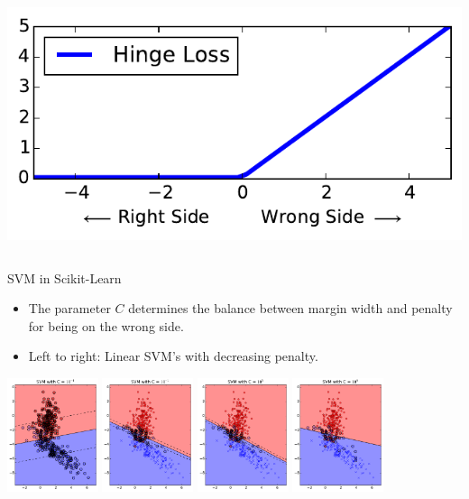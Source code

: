 \documentclass[10pt, aspectratio=169]{beamer} %
\begin{document}
\begin{frame}[fragile,allowframebreaks=0.8]
\begin{columns}[onlytextwidth]
\includegraphics[width=\columnwidth]{hinge_loss.pdf}
\end{columns}
\end{frame}


\begin{frame}[fragile,allowframebreaks=0.8]
{SVM in Scikit-Learn}
\begin{itemize}
\item The parameter $C$ determines the balance between margin width and penalty for being on the wrong side.
\item Left to right: Linear SVM's with decreasing penalty.
\end{itemize}
\begin{center}
\includegraphics[width=0.2\textwidth]{SVM_C_-4.pdf}
\includegraphics[width=0.2\textwidth]{SVM_C_-1.pdf}
\includegraphics[width=0.2\textwidth]{SVM_C_5.pdf}
\includegraphics[width=0.2\textwidth]{SVM_C_8.pdf}
\end{center}
\end{frame}
\end{document}
